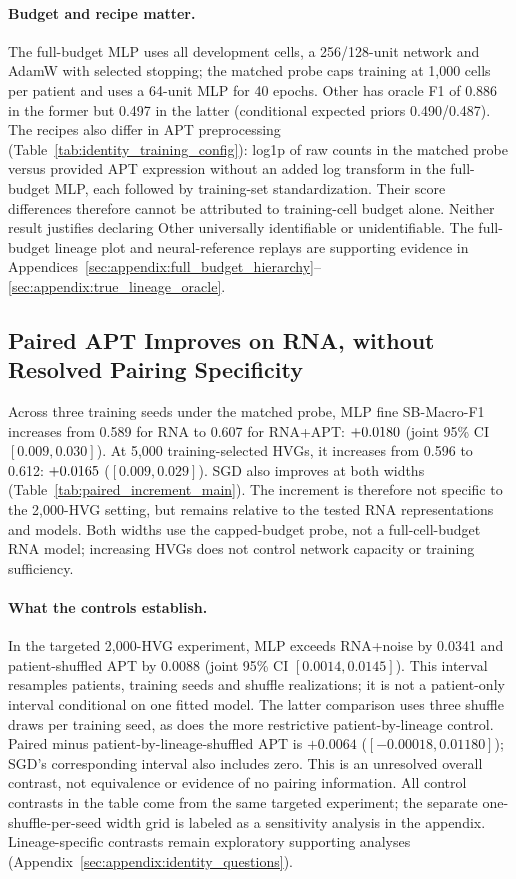 \paragraph{Budget and recipe matter.}
The full-budget MLP uses all development cells, a 256/128-unit network and
AdamW with selected stopping; the matched probe caps training at 1,000 cells
per patient and uses a 64-unit MLP for 40 epochs. Other has oracle F1 of
0.886 in the former but 0.497 in the latter (conditional expected priors
0.490/0.487). The recipes also differ in APT preprocessing
(Table~\ref{tab:identity_training_config}): log1p of raw counts in the matched
probe versus provided APT expression without an added log transform in the
full-budget MLP, each followed by training-set standardization.
Their score differences therefore cannot be attributed to training-cell budget alone.
Neither result justifies declaring Other universally identifiable or
unidentifiable. The full-budget lineage plot and neural-reference replays
are supporting evidence in Appendices~\ref{sec:appendix:full_budget_hierarchy}--\ref{sec:appendix:true_lineage_oracle}.

\subsection{Paired APT Improves on RNA, without Resolved Pairing Specificity}

Across three training seeds under the matched probe, MLP fine SB-Macro-F1 increases from 0.589 for RNA
to 0.607 for RNA+APT: $+0.0180{}$ (joint 95\% CI $[0.009,0.030]$).
At 5,000 training-selected HVGs, it increases from 0.596 to 0.612:
$+0.0165{}$ ($[0.009,0.029]$). SGD also improves at both widths
(Table~\ref{tab:paired_increment_main}). The increment is therefore not
specific to the 2,000-HVG setting, but remains relative to the tested RNA
representations and models.
Both widths use the capped-budget probe, not a full-cell-budget RNA model;
increasing HVGs does not control network capacity or training sufficiency.



\paragraph{What the controls establish.}
In the targeted 2,000-HVG experiment, MLP exceeds RNA+noise by 0.0341 and
patient-shuffled APT by 0.0088 (joint 95\% CI $[0.0014,0.0145]$).
This interval resamples patients, training seeds and shuffle realizations;
it is not a patient-only interval conditional on one fitted model.
The latter comparison uses three shuffle draws per
training seed, as does the more restrictive patient-by-lineage control.
Paired minus patient-by-lineage-shuffled APT is $+0.0064$
($[-0.00018,0.01180]$); SGD's corresponding interval also includes zero.
This is an unresolved overall contrast, not equivalence or evidence of no
pairing information. All control contrasts in the table come from the same
targeted experiment; the separate one-shuffle-per-seed width grid is labeled
as a sensitivity analysis in the appendix.
Lineage-specific contrasts remain exploratory supporting analyses
(Appendix~\ref{sec:appendix:identity_questions}).

